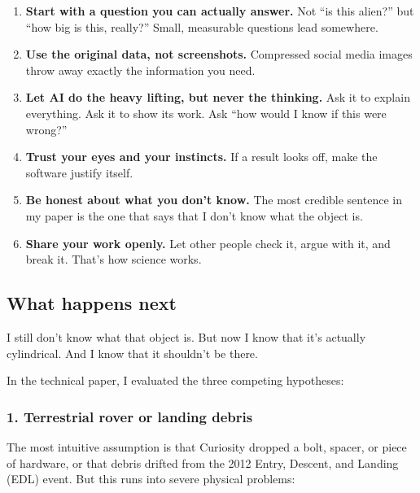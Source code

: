 \documentclass[11pt,a4paper]{article}
\newcommand{\horizontalrule}{}
\begin{document}
\begin{enumerate}
	\item \textbf{Start with a question you can actually answer.} Not ``is this alien?'' but ``how big is this, really?'' Small, measurable questions lead somewhere.
	\item \textbf{Use the original data, not screenshots.} Compressed social media images throw away exactly the information you need.
	\item \textbf{Let AI do the heavy lifting, but never the thinking.} Ask it to explain everything. Ask it to show its work. Ask ``how would I know if this were wrong?''
	\item \textbf{Trust your eyes and your instincts.} If a result looks off, make the software justify itself.
	\item \textbf{Be honest about what you don't know.} The most credible sentence in my paper is the one that says that I don't know what the object is.
	\item \textbf{Share your work openly.} Let other people check it, argue with it, and break it. That's how science works.
\end{enumerate}

\horizontalrule

\subsection*{What happens next}

I still don't know what that object is. But now I know that it's actually cylindrical. And I know that it shouldn't be there.

In the technical paper, I evaluated the three competing hypotheses:

\subsubsection*{1. Terrestrial rover or landing debris}
The most intuitive assumption is that Curiosity dropped a bolt, spacer, or piece of hardware, or that debris drifted from the 2012 Entry, Descent, and Landing (EDL) event. But this runs into severe physical problems:
\end{document}
